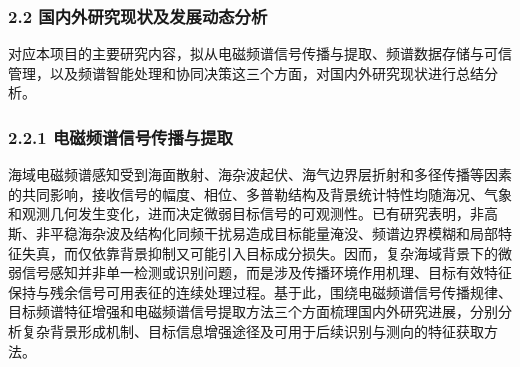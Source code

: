 \subsubsection{2.2 国内外研究现状及发展动态分析}

对应本项目的主要研究内容，拟从电磁频谱信号传播与提取、频谱数据存储与可信管理，以及频谱智能处理和协同决策这三个方面，对国内外研究现状进行总结分析。

\subsubsection{2.2.1 电磁频谱信号传播与提取}

海域电磁频谱感知受到海面散射、海杂波起伏、海气边界层折射和多径传播等因素的共同影响，接收信号的幅度、相位、多普勒结构及背景统计特性均随海况、气象和观测几何发生变化，进而决定微弱目标信号的可观测性。已有研究表明，非高斯、非平稳海杂波及结构化同频干扰易造成目标能量淹没、频谱边界模糊和局部特征失真，而仅依靠背景抑制又可能引入目标成分损失。因而，复杂海域背景下的微弱信号感知并非单一检测或识别问题，而是涉及传播环境作用机理、目标有效特征保持与残余信号可用表征的连续处理过程。基于此，围绕电磁频谱信号传播规律、目标频谱特征增强和电磁频谱信号提取方法三个方面梳理国内外研究进展，分别分析复杂背景形成机制、目标信息增强途径及可用于后续识别与测向的特征获取方法。

